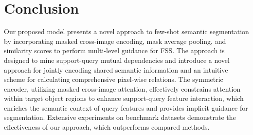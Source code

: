 \documentclass[conference]{IEEEtran}
\begin{document}
 

\section{Conclusion}
Our proposed model presents a novel approach to few-shot semantic segmentation by incorporating masked cross-image encoding, mask average pooling, and similarity scores to perform multi-level guidance for FSS. The approach is designed to mine support-query mutual dependencies and introduce a novel approach for jointly encoding shared semantic information and an intuitive scheme for calculating comprehensive pixel-wise relations. The symmetric encoder, utilizing masked cross-image attention, effectively constrains attention within target object regions to enhance support-query feature interaction, which enriches the semantic context of query features and provides implicit guidance for segmentation. Extensive experiments on benchmark datasets demonstrate the effectiveness of our approach, which outperforms compared methods.



\end{document}
